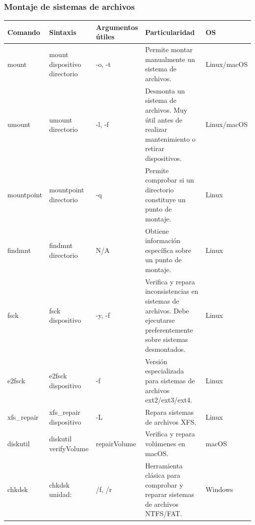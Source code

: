 \documentclass[a4paper,10pt]{article}
\begin{document}
\subsubsection{Montaje de sistemas de archivos}

\begin{longtable}{|p{2.8cm}|p{3.2cm}|p{4cm}|p{5.4cm}|p{1.5cm}|}

\hline
Comando &
Sintaxis &
Argumentos útiles &
Particularidad &
OS
\\
\hline
\endhead

mount &
mount dispositivo directorio &
-o, -t &
Permite montar manualmente un sistema de archivos. &
Linux/macOS
\\
\hline

umount &
umount directorio &
-l, -f &
Desmonta un sistema de archivos. Muy útil antes de realizar mantenimiento o retirar dispositivos. &
Linux/macOS
\\
\hline

mountpoint &
mountpoint directorio &
-q &
Permite comprobar si un directorio constituye un punto de montaje. &
Linux
\\
\hline

findmnt &
findmnt directorio &
N/A &
Obtiene información específica sobre un punto de montaje. &
Linux
\\
\hline

fsck &
fsck dispositivo &
-y, -f &
Verifica y repara inconsistencias en sistemas de archivos. Debe ejecutarse preferentemente sobre sistemas desmontados. &
Linux
\\
\hline

e2fsck &
e2fsck dispositivo &
-f &
Versión especializada para sistemas de archivos ext2/ext3/ext4. &
Linux
\\
\hline

xfs\_repair &
xfs\_repair dispositivo &
-L &
Repara sistemas de archivos XFS. &
Linux
\\
\hline

diskutil &
diskutil verifyVolume &
repairVolume &
Verifica y repara volúmenes en macOS. &
macOS
\\
\hline

chkdsk &
chkdsk unidad: &
/f, /r &
Herramienta clásica para comprobar y reparar sistemas de archivos NTFS/FAT. &
Windows
\\
\hline

\end{longtable}

\end{document}
